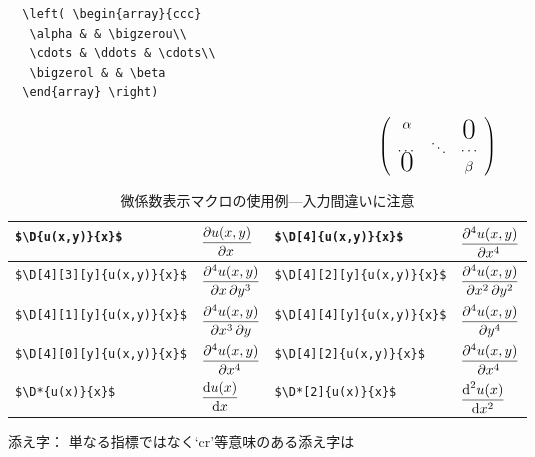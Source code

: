 \documentclass[onecolumn]{jsce}  %
\begin{document}
\begin{Description}
\begin{minipage}[c]{.35\textwidth}
\renewcommand{\baselinestretch}{.75}\small\normalsize
\begin{verbatim}
  \left( \begin{array}{ccc}
   \alpha & & \bigzerou\\
   \cdots & \ddots & \cdots\\
   \bigzerol & & \beta
  \end{array} \right)
\end{verbatim}
\renewcommand{\baselinestretch}{1}\small\normalsize
\end{minipage}
\hfill
\begin{minipage}[c]{.35\textwidth}
\begin{eqnarray*}
\left( \begin{array}{ccc}
 \alpha & & \bigzerou\\
 \cdots & \ddots & \cdots\\
 \bigzerol & & \beta
\end{array} \right)
\end{eqnarray*}
\end{minipage}
%
\begin{table}
\caption{微係数表示マクロの使用例---入力間違いに注意}
\label{tab:derivative}
\renewcommand{\arraystretch}{1.7}
\begin{center}
\begin{tabular}{|l|l||l|l|}\hline
\verb+$\D{u(x,y)}{x}$+ &
$\displaystyle\D{u(x,y)}{x}$ &
\verb+$\D[4]{u(x,y)}{x}$+ &
$\displaystyle\D[4]{u(x,y)}{x}$ \\ \hline
%
\verb+$\D[4][3][y]{u(x,y)}{x}$+ &
$\displaystyle\D[4][3][y]{u(x,y)}{x}$ &
\verb+$\D[4][2][y]{u(x,y)}{x}$+ &
$\displaystyle\D[4][2][y]{u(x,y)}{x}$ \\ \hline
%
\verb+$\D[4][1][y]{u(x,y)}{x}$+ &
$\displaystyle\D[4][1][y]{u(x,y)}{x}$ &
\verb+$\D[4][4][y]{u(x,y)}{x}$+ &
$\displaystyle\D[4][4][y]{u(x,y)}{x}$ \\ \hline
%
\verb+$\D[4][0][y]{u(x,y)}{x}$+ &
$\displaystyle\D[4][0][y]{u(x,y)}{x}$ &
\verb+$\D[4][2]{u(x,y)}{x}$+ &
$\displaystyle\D[4][2]{u(x,y)}{x}$ \\ \hline
%
\verb+$\D*{u(x)}{x}$+ &
$\displaystyle\D*{u(x)}{x}$ &
\verb+$\D*[2]{u(x)}{x}$+ &
$\displaystyle\D*[2]{u(x)}{x}$ \\ \hline
\end{tabular}
\end{center}
\end{table}
%
\item[　添え字：] 単なる指標ではなく`cr'等意味のある添え字は

\end{Description}
\end{document}
